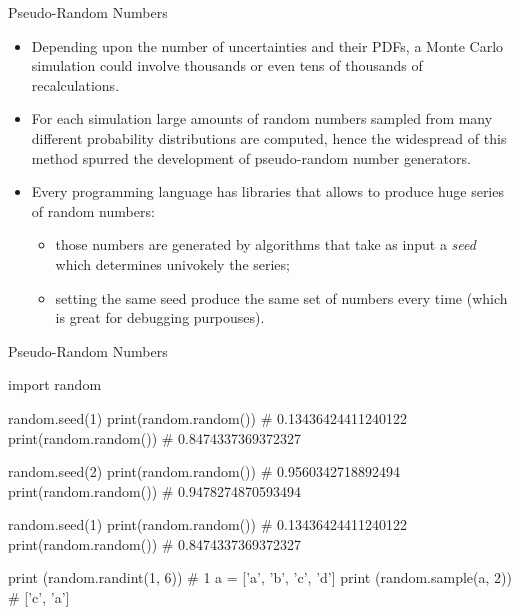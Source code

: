 \documentclass{beamer}
\begin{document}
\begin{frame}{Pseudo-Random Numbers}
    \begin{itemize}
    \item  Depending upon the number of uncertainties and their PDFs, a Monte Carlo simulation could involve thousands or even tens of thousands of recalculations.
    \item For each simulation large amounts of random numbers sampled from many different probability distributions are computed, hence the widespread of this method spurred the development of pseudo-random number generators. 
    \item Every programming language has libraries that allows to produce huge series of random numbers:
    \begin{itemize}
        \item those numbers are generated by algorithms that take as input a \emph{seed} which determines univokely the series; 
        \item setting the same seed produce the same set of numbers every time (which is great for debugging purpouses).
    \end{itemize}
    \end{itemize}
\end{frame}

\begin{frame}[fragile]{Pseudo-Random Numbers}  
\begin{ipython}
import random 

random.seed(1)
print(random.random())       # 0.13436424411240122
print(random.random())       # 0.8474337369372327

random.seed(2)
print(random.random())       # 0.9560342718892494
print(random.random())       # 0.9478274870593494

random.seed(1)
print(random.random())       # 0.13436424411240122
print(random.random())       # 0.8474337369372327

print (random.randint(1, 6)) # 1
a = ['a', 'b', 'c', 'd']
print (random.sample(a, 2))  # ['c', 'a']
\end{ipython}
\end{frame}
\end{document}
